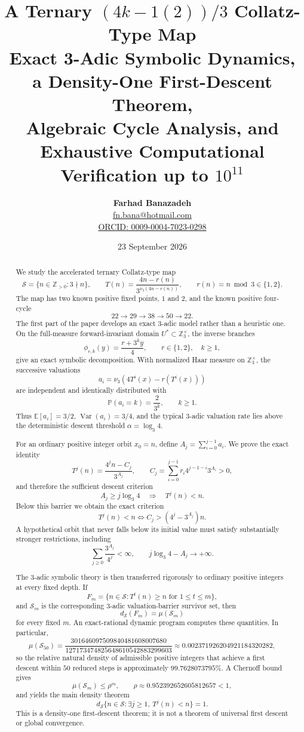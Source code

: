 \documentclass[11pt]{article}
\title{\textbf{A Ternary $(4k-1(2))/3$ Collatz-Type Map}\\[4pt]
\large Exact 3-Adic Symbolic Dynamics, a Density-One First-Descent Theorem,\\
Algebraic Cycle Analysis, and Exhaustive Computational Verification up to $10^{11}$}
\author{\textbf{Farhad Banazadeh}\\
\href{mailto:fn.bana@hotmail.com}{fn.bana@hotmail.com}\\
\href{https://orcid.org/0009-0004-7023-0298}{ORCID: 0009-0004-7023-0298}}
\date{23 September 2026}
\theoremstyle{definition}
\theoremstyle{remark}
\newcommand{\vthree}{\nu_3}
\newcommand{\Sset}{\mathcal S}
\newcommand{\Ustar}{U^\ast}
\newcommand{\Tmap}{T}
\newcommand{\Z}{\mathbb Z}
\newcommand{\Zthree}{\mathbb Z_3}
\newcommand{\Prob}{\mathbb P}
\newcommand{\E}{\mathbb E}
\newcommand{\ds}{d_{\Sset}}
\begin{document}
\maketitle

\begin{abstract}\sloppy
We study the accelerated ternary Collatz-type map
\[
\Sset=\{n\in\Z_{>0}:3\nmid n\},\qquad
\Tmap(n)=\frac{4n-r(n)}{3^{\vthree(4n-r(n))}},
\qquad r(n)=n\bmod3\in\{1,2\}.
\]
The map has two known positive fixed points, $1$ and $2$, and the known positive four-cycle
\[
22\to29\to38\to50\to22.
\]
The first part of the paper develops an exact $3$-adic model rather than a heuristic one.  On the full-measure forward-invariant domain
$\Ustar\subset\Zthree^\times$, the inverse branches
\[
\phi_{r,k}(y)=\frac{r+3^ky}{4},
\qquad r\in\{1,2\},\quad k\ge1,
\]
give an exact symbolic decomposition.  With normalized Haar measure on
$\Zthree^\times$, the successive valuations
\[
a_i=\vthree(4T^i(x)-r(T^i(x)))
\]
are independent and identically distributed with
\[
\Prob(a_i=k)=\frac{2}{3^k},\qquad k\ge1.
\]
Thus $\E[a_i]=3/2$, $\operatorname{Var}(a_i)=3/4$, and the typical
$3$-adic valuation rate lies above the deterministic descent threshold
$\alpha=\log_3 4$.

For an ordinary positive integer orbit $x_0=n$, define
$A_j=\sum_{i=0}^{j-1}a_i$.  We prove the exact identity
\[
T^j(n)=\frac{4^jn-C_j}{3^{A_j}},
\qquad
C_j=\sum_{i=0}^{j-1}r_i4^{j-1-i}3^{A_i}>0,
\]
and therefore the sufficient descent criterion
\[
A_j\ge j\log_3 4\quad\Longrightarrow\quad T^j(n)<n.
\]
Below this barrier we obtain the exact criterion
\[
T^j(n)<n
\iff
C_j>(4^j-3^{A_j})n.
\]
A hypothetical orbit that never falls below its initial value must satisfy substantially stronger restrictions, including
\[
\sum_{j\ge0}\frac{3^{A_j}}{4^j}<\infty,
\qquad
j\log_3 4-A_j\to+\infty.
\]

The $3$-adic symbolic theory is then transferred rigorously to ordinary positive integers at every fixed depth.  If
\[
F_m=\{n\in\Sset:T^t(n)\ge n\text{ for }1\le t\le m\},
\]
and $\mathcal S_m$ is the corresponding $3$-adic valuation-barrier survivor set, then
\[
\boxed{\ds(F_m)=\mu(\mathcal S_m)}
\]
for every fixed $m$.  An exact-rational dynamic program computes these quantities.  In particular,
\[
\mu(\mathcal S_{50})
=
\frac{301646097509840481608007680}
{127173474825648610542883299603}
\approx0.002371926204921184320282,
\]
so the relative natural density of admissible positive integers that achieve a first descent within $50$ reduced steps is approximately
$99.7628073795\%$.  A Chernoff bound gives
\[
\mu(\mathcal S_m)\le\rho^m,\qquad
\rho\approx0.952392652605812657<1,
\]
and yields the main density theorem
\[
\boxed{\ds\{n\in\Sset:\exists j\ge1,\ T^j(n)<n\}=1.}
\]
This is a density-one first-descent theorem; it is not a theorem of universal first descent or global convergence.


\end{abstract}
\end{document}
